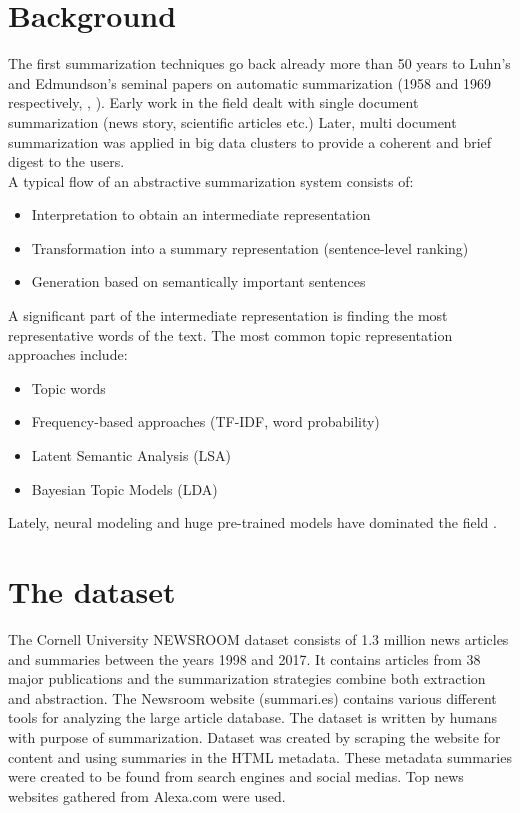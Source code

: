 \documentclass{article}
\begin{document}
\section{Background}
The first summarization techniques go back already more than 50 years to Luhn’s and Edmundson’s seminal papers on automatic summarization (1958 and 1969 respectively, \cite{textmining1958}, \cite{automaticextracting}). Early work in the field dealt with single document summarization (news story, scientific articles etc.) Later, multi document summarization was applied in big data clusters to provide a coherent and brief digest to the users. \\

\noindent
A typical flow of an abstractive summarization system \cite{summarizing} consists of:
\begin{itemize}
	\item Interpretation to obtain an intermediate representation
	\item Transformation into a summary representation (sentence-level ranking)
	\item Generation based on semantically important sentences
\end{itemize}

A significant part of the intermediate representation is finding the most representative words of the text. The most common topic representation approaches \cite{survey} include:
\begin{itemize}
	\item Topic words 
	\item Frequency-based approaches (TF-IDF, word probability)
	\item Latent Semantic Analysis (LSA)
	\item Bayesian Topic Models (LDA)
\end{itemize}

Lately, neural modeling and huge pre-trained models have dominated the field \cite{neuralextractive}.

\section{The dataset}

The Cornell University NEWSROOM dataset \cite{dataset} consists of 1.3 million news articles and summaries between the years 1998 and 2017. It contains articles from 38 major publications and the summarization strategies combine both extraction and abstraction. The Newsroom website (summari.es) contains various different tools for analyzing the large article database. The dataset is written by humans with purpose of summarization. Dataset was created by scraping the website for content and using summaries in the HTML metadata. These metadata summaries were created to be found from search engines and social medias. Top news websites gathered from Alexa.com were used. \\
\end{document}
